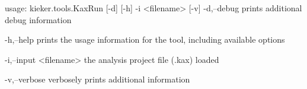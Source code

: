 usage: kieker.tools.KaxRun [-d] [-h] -i <filename> [-v]
 -d,--debug
        prints additional debug information

 -h,--help
        prints the usage information for the tool, including available
        options

 -i,--input <filename>
        the analysis project file (.kax) loaded

 -v,--verbose
        verbosely prints additional information